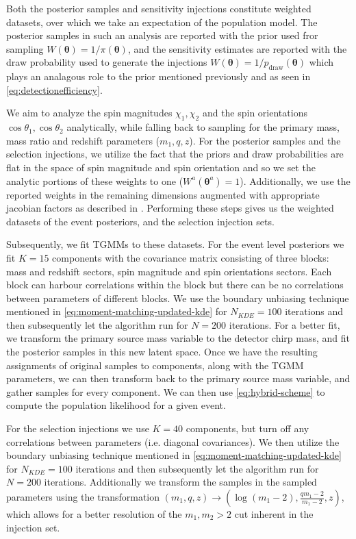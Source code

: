 \documentclass[twocolumn,usenames,dvipsnames,linenumbers]{aastex631}
\newcommand{\btheta}{\boldsymbol{\theta}}
\begin{document}
Both the posterior samples and sensitivity injections constitute weighted datasets, over which we take an expectation of the population model. The posterior samples in such an analysis are reported with the prior used fror sampling $W(\btheta)= 1/\pi(\btheta)$, and the sensitivity estimates are reported with the draw probability used to generate the injections $W(\btheta)= 1/p_{\text{draw}}(\btheta)$ which plays an analagous role to the prior mentioned previously and as seen in \eqref{eq:detectionefficiency}.

We aim to analyze the spin magnitudes $\chi_1, \chi_2$ and the spin orientations $\cos\theta_1, \cos\theta_2$ analytically, while falling back to sampling for the primary mass, mass ratio and redshift parameters ($m_1, q, z$). For the posterior samples and the selection injections, we utilize the fact that the priors and draw probabilities are flat in the space of spin magnitude and spin orientation and so we set the analytic portions of these weights to one ($W^a(\btheta^{a}) = 1$).
Additionally, we use the reported weights in the remaining dimensions augmented with appropriate jacobian factors as described in \cite{LVKPop}. Performing these steps gives us the weighted datasets of the event posteriors, and the selection injection sets.

Subsequently, we fit \acp{TGMM} to these datasets. For the event level posteriors we fit $K = 15$ components with the covariance matrix consisting of three blocks: mass and redshift sectors, spin magnitude and spin orientations sectors. Each block can harbour correlations within the block but there can be no correlations between parameters of different blocks. We use the boundary unbiasing technique mentioned in \eqref{eq:moment-matching-updated-kde} for $N_{KDE} = 100$ iterations and then subsequently let the algorithm run for $N = 200$ iterations. For a better fit, we transform the primary source mass variable to the detector chirp mass, and fit the posterior samples in this new latent space. Once we have the resulting assignments of original samples to components, along with the \ac{TGMM} parameters, we can then transform back to the primary source mass variable, and gather samples for every component. We can then use \eqref{eq:hybrid-scheme} to compute the population likelihood for a given event. 

For the selection injections we use $K = 40$ components, but turn off any correlations between parameters (i.e. diagonal covariances). We then utilize the boundary unbiasing technique mentioned in \eqref{eq:moment-matching-updated-kde} for $N_{KDE} = 100$ iterations and then subsequently let the algorithm run for $N = 200$ iterations. Additionally we transform the samples in the sampled parameters using the transformation $(m_1, q, z) \to (\log(m_1 - 2), \frac{q m_1 - 2}{m_1 - 2}, z)$, which allows for a better resolution of the $m_1, m_2 > 2$ cut inherent in the injection set. 
\end{document}
